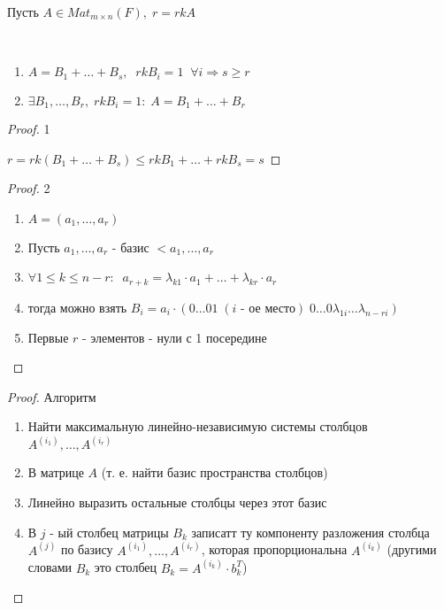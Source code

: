 \begin{lemma}
    
    Пусть $A \in Mat_{m \times n}(F), \; r = rk A$

    \begin{properties}~
        
        \begin{enumerate}
            \item $A = B_1 + \dots + B_s, \;\; rk B_i = 1 \;\; \forall i \Rightarrow s \geq r$
            \item $\exists B_1, \dots, B_r, \; rk B_i = 1: \; A = B_1 + \dots + B_r$
        \end{enumerate}

    \end{properties}

    \bigskip

    \begin{proof} 1~

        $r = rk (B_1 + \dots + B_s) \leq rk B_1 + \dots + rk B_s = s$
        
    \end{proof}

    \bigskip

    \begin{proof} 2~

        \begin{enumerate}
            \item $A = \left(a_1, \dots, a_r\right)$
            \item Пусть $a_1, \dots, a_r$ - базис $<a_1, \dots, a_r$
            \item $\forall 1 \leq k \leq n - r: \;\; a_{r + k} = \lambda_{k1} \cdot a_1 + \dots + \lambda_{kr} \cdot a_r$
            \item тогда можно взять $B_i = a_i \cdot (0 \dots 0 1 \; (\text{$i$ - ое место}) \; 0 \dots 0 \lambda_{1i} \dots \lambda_{n-r i})$
            \item Первые $r$ - элементов - нули с 1 посередине
        \end{enumerate}
        
    \end{proof}

    \bigskip

    \begin{proof} Алгоритм~
        
        \begin{enumerate}
            \item Найти максимальную линейно-независимую системы столбцов $A^{(i_1)}, \dots, A^{(i_r)}$
            \item В матрице $A$ (т. е. найти базис пространства столбцов)
            \item Линейно выразить остальные столбцы через этот базис
            \item В $j$ - ый столбец матрицы $B_k$ записатт ту компоненту разложения столбца $A^{(j)}$ по базису $A^{(i_1)}, \dots, A^{(i_r)}$, которая пропорциональна $A^{(i_k)}$ (другими словами $B_k$ это столбец $B_k = A^{(i_k)} \cdot b_k^T$)
        \end{enumerate}


\end{proof}
\end{lemma}
